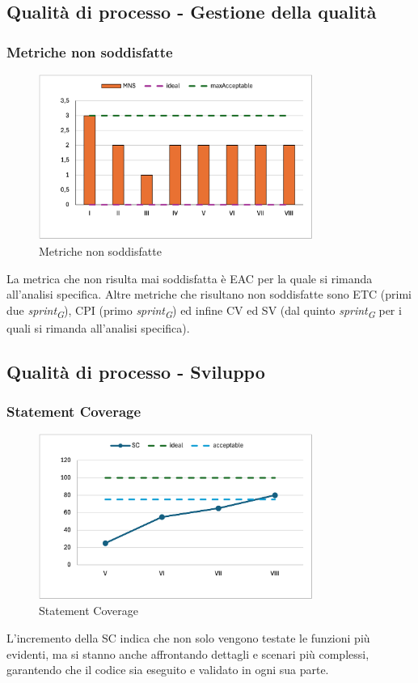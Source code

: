\subsection{Qualità di processo - Gestione della qualità}
\subsubsection{Metriche non soddisfatte}
\begin{figure}[H]
    \centering
    \includegraphics[width=0.8\textwidth]{./images/MNS.png}
    \caption{Metriche non soddisfatte}
\end{figure}
La metrica che non risulta mai soddisfatta è EAC per la quale si rimanda all'analisi specifica. Altre metriche che risultano non soddisfatte sono ETC (primi due \textit{sprint\textsubscript{G}}), CPI (primo \textit{sprint\textsubscript{G}}) ed infine CV ed SV (dal quinto \textit{sprint\textsubscript{G}} per i quali si rimanda all'analisi specifica).

\subsection{Qualità di processo - Sviluppo}
\subsubsection{Statement Coverage}
\begin{figure}[H]
    \centering
    \includegraphics[width=0.8\textwidth]{./images/SC.png}
    \caption{Statement Coverage}
\end{figure}
 L’incremento della SC indica che non solo vengono testate le funzioni più evidenti, ma si stanno anche affrontando dettagli e scenari più complessi, garantendo che il codice sia eseguito e validato in ogni sua parte.

